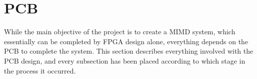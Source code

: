
\clearpage

\section{PCB}\label{section:pcb}

While the main objective of the project is to create a MIMD system, which
essentially can be completed by FPGA design alone, everything depends on the PCB
to complete the system. This section describes everything involved with the PCB
design, and every subsection has been placed according to which stage in the
process it occurred.






